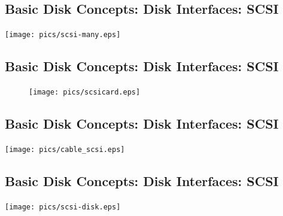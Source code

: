 \documentclass[xga]{xdvislides}
\begin{document}
\subsection{Basic Disk Concepts: Disk Interfaces: SCSI}
	\begin{center}
		\texttt{[image: pics/scsi-many.eps]} \\
	\end{center}


\subsection{Basic Disk Concepts: Disk Interfaces: SCSI}
\begin{figure}[hb]
	\begin{center}
		\texttt{[image: pics/scsicard.eps]} \\
	\end{center}
\end{figure}

\subsection{Basic Disk Concepts: Disk Interfaces: SCSI}
\vfill
	\begin{center}
		\texttt{[image: pics/cable\_scsi.eps]} \\
	\end{center}
\vfill


\subsection{Basic Disk Concepts: Disk Interfaces: SCSI}
\vfill
	\begin{center}
		\texttt{[image: pics/scsi-disk.eps]} \\
	\end{center}
\vfill

\end{document}
